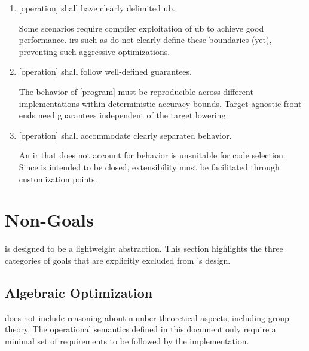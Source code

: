 \begin{enumerate}
    \item[\Goal{goal:ub}] [operation] shall have clearly delimited \gls{ub}.

    \begin{highlight}{}
        Some scenarios require compiler exploitation of \gls{ub} to achieve good performance.
        \Glspl{ir} such as \arith do not clearly define these boundaries (yet), preventing such aggressive optimizations.
    \end{highlight}

    \item[\Goal{goal:rounding}] [operation] shall follow well-defined  guarantees.

    \begin{highlight}{}
        The behavior of \basetwo {}[program] must be reproducible across different implementations within deterministic accuracy bounds.
        Target-agnostic front-ends need guarantees independent of the target lowering.
    \end{highlight}

    \item[\Goal{goal:impldef}] [operation] shall accommodate clearly separated \impldef behavior.

    \begin{highlight}{}
        An \gls{ir} that does not account for \impldef behavior is unsuitable for code selection.
        Since \basetwo is intended to be closed, extensibility must be facilitated through \impldef customization points.
    \end{highlight}
\end{enumerate}

\section{Non-Goals}

\basetwo is designed to be a lightweight abstraction.
This section highlights the three categories of goals that are explicitly excluded from \basetwo's design.

\subsection{Algebraic Optimization}
\label{goal:algebra}

\basetwo does not include reasoning about number-theoretical aspects, including group theory.
The operational semantics defined in this document only require a minimal set of requirements to be followed by the implementation.

